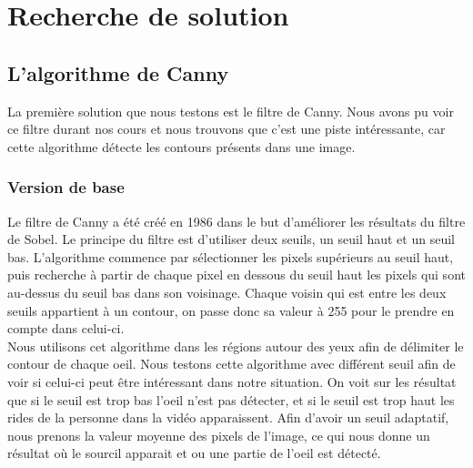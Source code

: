 \section{Recherche de solution}

\subsection{L'algorithme de Canny}
La première solution que nous testons est le filtre de Canny. Nous avons pu voir ce filtre durant
nos cours et nous trouvons que c'est une piste intéressante, car cette algorithme détecte les contours
présents dans une image.

\subsubsection{Version de base}
Le filtre de Canny a été créé en 1986 dans le but d'améliorer les résultats du filtre de Sobel.
Le principe du filtre est d'utiliser deux seuils, un seuil haut et un seuil bas. L'algorithme
commence par sélectionner les pixels supérieurs au seuil haut, puis recherche à partir de chaque
pixel en dessous du seuil haut les pixels qui sont au-dessus du seuil bas dans son voisinage. 
Chaque voisin qui est entre les deux seuils appartient à un contour, on passe donc sa valeur à
255 pour le prendre en compte dans celui-ci.\\ 

Nous utilisons cet algorithme dans les régions autour des yeux afin de délimiter le contour
de chaque oeil. Nous testons cette algorithme avec différent seuil afin de voir si celui-ci
peut être intéressant dans notre situation. On voit sur les résultat que si le seuil est trop
bas l'oeil n'est pas détecter, et si le seuil est trop haut les rides de la personne dans la vidéo
apparaissent. Afin d'avoir un seuil adaptatif, nous prenons la valeur moyenne des pixels de l'image, ce
qui nous donne un résultat où le sourcil apparait et ou une partie de l'oeil est détecté.


